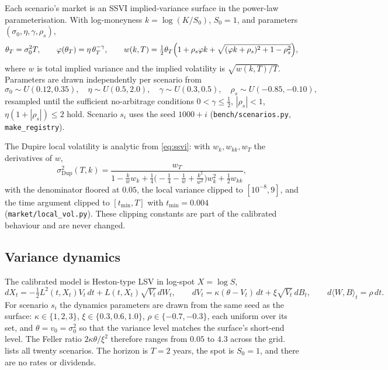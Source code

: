 \documentclass[11pt,a4paper]{article}
\newcommand{\sigDup}{\sigma_{\mathrm{Dup}}}
\newcommand{\Lev}{L}
\newcommand{\code}[1]{\texttt{#1}}
\begin{document}
Each scenario's market is an SSVI implied-variance surface in the power-law parameterisation. With log-moneyness $k=\log(K/S_0)$, $S_0=1$, and parameters $(\sigma_0,\eta,\gamma,\rho_s)$,
\begin{equation}\label{eq:ssvi}
  \theta_T = \sigma_0^2 T,\qquad
  \varphi(\theta_T) = \eta\,\theta_T^{-\gamma},\qquad
  w(k,T) = \tfrac12\theta_T\Bigl(1+\rho_s\varphi k+\sqrt{(\varphi k+\rho_s)^2+1-\rho_s^2}\Bigr),
\end{equation}
where $w$ is total implied variance and the implied volatility is $\sqrt{w(k,T)/T}$. Parameters are drawn independently per scenario from
\[
  \sigma_0\sim U(0.12,0.35),\quad \eta\sim U(0.5,2.0),\quad \gamma\sim U(0.3,0.5),\quad \rho_s\sim U(-0.85,-0.10),
\]
resampled until the sufficient no-arbitrage conditions $0<\gamma\le\tfrac12$, $|\rho_s|<1$, $\eta(1+|\rho_s|)\le 2$ hold. Scenario $s_i$ uses the seed $1000+i$ (\code{bench/scenarios.py}, \code{make\_registry}).

The Dupire local volatility is analytic from \cref{eq:ssvi}: with $w_k,w_{kk},w_T$ the derivatives of $w$,
\begin{equation}\label{eq:dupire}
  \sigDup^2(T,k) = \frac{w_T}{1-\frac{k}{w}w_k+\frac14\bigl(-\frac14-\frac1w+\frac{k^2}{w^2}\bigr)w_k^2+\frac12 w_{kk}},
\end{equation}
with the denominator floored at $0.05$, the local variance clipped to $[10^{-8},9]$, and the time argument clipped to $[t_{\min},T]$ with $t_{\min}=0.004$ (\code{market/local\_vol.py}). These clipping constants are part of the calibrated behaviour and are never changed.

\subsection{Variance dynamics}\label{sec:dyn}

The calibrated model is Heston-type LSV in log-spot $X=\log S$,
\begin{equation}\label{eq:lsv}
  dX_t = -\tfrac12\Lev^2(t,X_t)V_t\,dt+\Lev(t,X_t)\sqrt{V_t}\,dW_t,\qquad
  dV_t = \kappa(\theta-V_t)\,dt+\xi\sqrt{V_t}\,dB_t,\qquad d\langle W,B\rangle_t=\rho\,dt .
\end{equation}
For scenario $s_i$ the dynamics parameters are drawn from the same seed as the surface: $\kappa\in\{1,2,3\}$, $\xi\in\{0.3,0.6,1.0\}$, $\rho\in\{-0.7,-0.3\}$, each uniform over its set, and $\theta=v_0=\sigma_0^2$ so that the variance level matches the surface's short-end level. The Feller ratio $2\kappa\theta/\xi^2$ therefore ranges from $0.05$ to $4.3$ across the grid.  lists all twenty scenarios. The horizon is $T=2$ years, the spot is $S_0=1$, and there are no rates or dividends.
\end{document}
